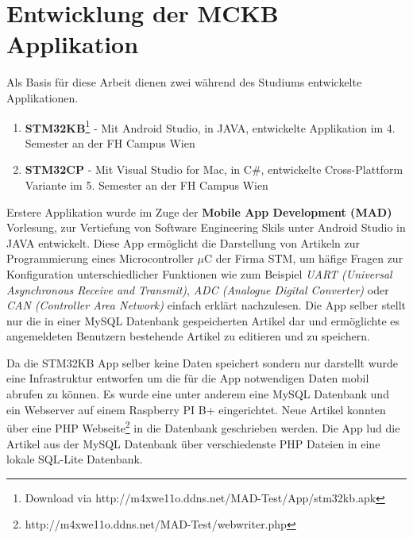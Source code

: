 %
%
% 
% 


\chapter{Entwicklung der MCKB Applikation}
\label{chap:xamarinformsdevelopment}

	Als Basis für diese Arbeit dienen zwei während des Studiums entwickelte Applikationen.
	\begin{enumerate}
		\setlength\itemsep{0em}
		\item \textbf{STM32KB}\footnote{Download via http://m4xwe11o.ddns.net/MAD-Test/App/stm32kb.apk} - Mit Android Studio, in JAVA, entwickelte Applikation im 4. Semester an der FH Campus Wien
		\item \textbf{STM32CP} - Mit Visual Studio for Mac, in C\#, entwickelte Cross-Plattform Variante im 5. Semester an der FH Campus Wien
	\end{enumerate}
	Erstere Applikation wurde im Zuge der \textbf{Mobile App Development (MAD)} Vorlesung, zur Vertiefung von Software Engineering Skils unter Android Studio in JAVA entwickelt. Diese App ermöglicht die Darstellung von Artikeln zur Programmierung eines Microcontroller $\mu$C der Firma STM, um häfige Fragen zur Konfiguration unterschiedlicher Funktionen wie zum Beispiel \textit{UART (Universal Asynchronous Receive and Transmit)}, \textit{ADC (Analogue Digital Converter)} oder \textit{CAN (Controller Area Network)} einfach erklärt nachzulesen. Die App selber stellt nur die in einer MySQL Datenbank gespeicherten Artikel dar und ermöglichte es angemeldeten Benutzern bestehende Artikel zu editieren und zu speichern.

	Da die STM32KB App selber keine Daten speichert sondern nur darstellt wurde eine Infrastruktur entworfen um die für die App notwendigen Daten mobil abrufen zu können. Es wurde eine unter anderem eine MySQL Datenbank und ein Webserver auf einem Raspberry PI B+ eingerichtet. Neue Artikel konnten über eine PHP Webseite\footnote{http://m4xwe11o.ddns.net/MAD-Test/webwriter.php} in die Datenbank geschrieben werden. Die App lud die Artikel aus der MySQL Datenbank über verschiedenste PHP Dateien in eine lokale SQL-Lite Datenbank.

